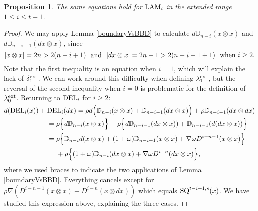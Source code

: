 \documentclass[11pt]{amsart} \renewcommand{\baselinestretch}{1.2}
\theoremstyle{plain}
\newtheorem{prop}[thm]{Proposition}
\numberwithin{equation}{section} %
\theoremstyle{plain}
\newtheorem{prop}[thm]{Proposition}
\numberwithin{equation}{chapter} %
\newcommand{\twist}{\omega}
\newcommand{\Nabla}{\nabla}
\begin{document}
\begin{second quadrant homotopy sseq operations}
\begin{prop}
The same equations hold for $\textup{LAM}_i$ in the extended range $1\leq i\leq t+1$.
\end{prop}
\begin{proof}
We may apply Lemma \ref{boundaryVsBBD} to calculate $d\mathbb{D}_{n-i}(x\otimes x)$ and $d\mathbb{D}_{n-i-1}(dx\otimes x)$, since 
\[|x\otimes x|=2n> 2(n-i+1)\textup{ \ and \ }|dx\otimes x|=2n-1> 2(n-i-1+1) \textup{ \ when $i\geq2$}.\]
Note that the first inequality is an equation when  $i=1$, which will explain the lack of $\delta^\textup{ext}_1$. We can work around this difficulty when defining $\lambda^\textup{ext}_1$, but the reversal of the second inequality when $i=0$ is problematic for the definition of $\lambda^\textup{ext}_0$. Returning to $\textup{DEL}_i$ for $i\geq2$:
\begin{alignat*}{2}
d(\textup{DEL}_i(x))+{}& \textup{DEL}_i(dx)
=
\smash{\rho d\Bigl(\mathbb{D}_{n-i}(x\otimes x)+\mathbb{D}_{n-i-1}(dx\otimes x)\Bigr)}+\rho\mathbb{D}_{n-i-1}(dx\otimes dx)%
\\
&=
\rho\Bigl\{d\mathbb{D}_{n-i}(x\otimes x)\Bigr\}+\rho\Bigl\{d\mathbb{D}_{n-i-1}(dx\otimes x))+\mathbb{D}_{n-i-1}(d(dx\otimes x))\Bigr\}%
\\
&=
\rho\Bigl\{\mathbb{D}_{n-i}d(x\otimes x)+(1+\twist)\mathbb{D}_{n-i+1}(x\otimes x)+\Nabla\twist D^{i-n-1}(x\otimes x)\Bigr\}
\\
&\ \ \ \ +\rho\Bigl\{(1+\twist)\mathbb{D}_{n-i}(dx\otimes x)+\Nabla\twist D^{i-n}(dx\otimes x)\Bigr\},
\end{alignat*}
where we used braces to indicate the two applications of Lemma \ref{boundaryVsBBD}.
Everything cancels except for $\rho\Nabla(D^{i-n-1}(x\otimes x)+D^{i-n}(x\otimes dx))$ which equals $\textup{SQ}^{t-i+1,s}(x)$. We have studied this expression above, explaining the three cases.


\end{proof}
\end{second quadrant homotopy sseq operations}
\end{document}
